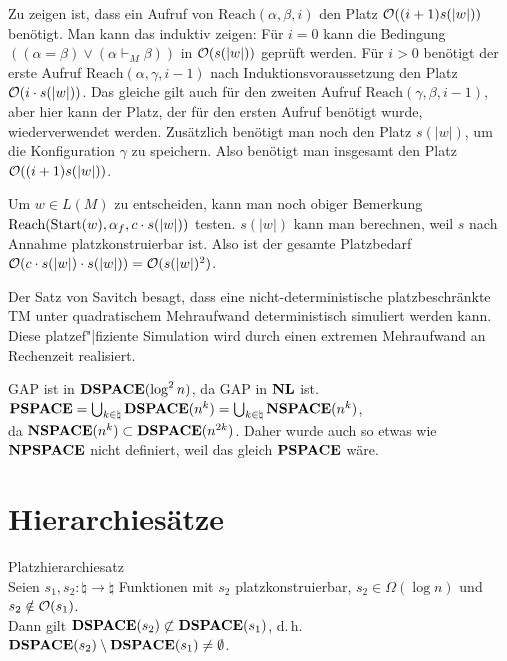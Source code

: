 \begin{Beweis}
    Zu zeigen ist, dass ein Aufruf von $\text{Reach}(\alpha, \beta, i)$ den Platz
    $\mathcal{O}((i + 1) s(|w|))$ benötigt.
    Man kann das induktiv zeigen:
    Für $i = 0$ kann die Bedingung
    $((\alpha = \beta) \lor (\alpha \vdash_M \beta))$ in $\mathcal{O}(s(|w|))$ geprüft werden.
    Für $i > 0$ benötigt der erste Aufruf $\text{Reach}(\alpha, \gamma, i - 1)$ nach
    Induktionsvoraussetzung den Platz $\mathcal{O}(i \cdot s(|w|))$.
    Das gleiche gilt auch für den zweiten Aufruf $\text{Reach}(\gamma, \beta, i - 1)$,
    aber hier kann der Platz, der für den ersten Aufruf benötigt wurde, wiederverwendet werden.
    Zusätzlich benötigt man noch den Platz $s(|w|)$, um die Konfiguration $\gamma$ zu speichern.
    Also benötigt man insgesamt den Platz $\mathcal{O}((i + 1) s(|w|))$.

    Um $w \in L(M)$ zu entscheiden, kann man noch obiger Bemerkung
    $\text{Reach}(\text{Start}(w), \alpha_f, c \cdot s(|w|))$ testen.
    $s(|w|)$ kann man berechnen, weil $s$ nach Annahme platzkonstruierbar ist.
    Also ist der gesamte Platzbedarf
    $\mathcal{O}(c \cdot s(|w|) \cdot s(|w|)) = \mathcal{O}(s(|w|)^2)$.
\end{Beweis}

\linie
\pagebreak

\begin{Bem}
    Der Satz von Savitch besagt, dass eine nicht-deterministische platzbeschränkte TM unter
    quadratischem Mehraufwand deterministisch simuliert werden kann.
    Diese platzef"|fiziente Simulation wird durch einen extremen Mehraufwand an Rechenzeit
    realisiert.
\end{Bem}

\begin{Kor}
    GAP ist in $\mathbf{DSPACE}(\log^2 n)$, da GAP in $\mathbf{NL}$ ist.\\
    $\mathbf{PSPACE} = \bigcup_{k \in \natural} \mathbf{DSPACE}(n^k) =
    \bigcup_{k \in \natural} \mathbf{NSPACE}(n^k)$,\\
    da $\mathbf{NSPACE}(n^k) \subset \mathbf{DSPACE}(n^{2k})$.
    Daher wurde auch so etwas wie $\mathbf{NPSPACE}$ nicht definiert, weil das gleich $\mathbf{PSPACE}$ wäre.
\end{Kor}

\section{%
    Hierarchiesätze%
}

\begin{Satz}{Platzhierarchiesatz}\\
    Seien $s_1, s_2\colon \natural \rightarrow \natural$ Funktionen mit
    $s_2$ platzkonstruierbar, $s_2 \in \Omega(\log n)$ und $s_2 \notin \mathcal{O}(s_1)$.\\
    Dann gilt $\mathbf{DSPACE}(s_2) \not\subset \mathbf{DSPACE}(s_1)$, d.\,h.
    $\mathbf{DSPACE}(s_2) \setminus \mathbf{DSPACE}(s_1) \not= \emptyset$.
\end{Satz}

